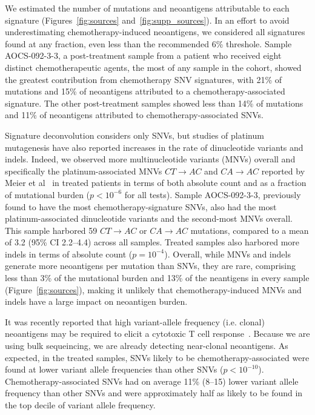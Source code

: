We estimated the number of mutations and neoantigens attributable to each signature (Figures~\ref{fig:sources} and~\ref{fig:supp_sources}). In an effort to avoid underestimating chemotherapy-induced neoantigens, we considered all signatures found at any fraction, even less than the recommended 6\% threshole. Sample AOCS-092-3-3, a post-treatment sample from a patient who received eight distinct chemotherapeutic agents, the most of any sample in the cohort, showed the greatest contribution from chemotherapy SNV signatures, with 21\% of mutations and 15\% of neoantigens attributed to a chemotherapy-associated signature. The other post-treatment samples showed less than 14\% of mutations and 11\% of neoantigens attributed to chemotherapy-associated SNVs.

Signature deconvolution considers only SNVs, but studies of platinum mutagenesis have also reported increases in the rate of dinucleotide variants and indels. Indeed, we observed more multinucleotide variants (MNVs) overall and specifically the platinum-associated MNVs $CT \rightarrow AC$ and $CA \rightarrow AC$ reported by Meier et al~\cite{Meier_2014} in treated patients in terms of both absolute count and as a fraction of mutational burden ($p < 10^{-6}$ for all tests). Sample AOCS-092-3-3, previously found to have the most chemotherapy-signature SNVs, also had the most platinum-associated dinucleotide variants and the second-most MNVs overall. This sample harbored 59 $CT \rightarrow AC$ or $CA \rightarrow AC$ mutations, compared to a mean of 3.2 (95\% CI 2.2--4.4) across all samples. Treated samples also harbored more indels in terms of absolute count ($p=10^{-4}$). Overall, while MNVs and indels generate more neoantigens per mutation than SNVs, they are rare, comprising less than 3\% of the mutational burden and 13\% of the neantigens in every sample (Figure~\ref{fig:sources}), making it unlikely that chemotherapy-induced MNVs and indels have a large impact on neoantigen burden.




It was recently reported that high variant-allele frequency (i.e. clonal) neoantigens may be required to elicit a cytotoxic T cell response~\cite{McGranahan_2016}. Because we are using bulk sequeincing, we are already detecting near-clonal neoantigens. As expected, in the treated samples, SNVs likely to be chemotherapy-associated were found at lower variant allele frequencies than other SNVs ($p < 10^{-10}$). Chemotherapy-associated SNVs had on average 11\% (8--15) lower variant allele frequency than other SNVs and were approximately half as likely to be found in the top decile of variant allele frequency.

